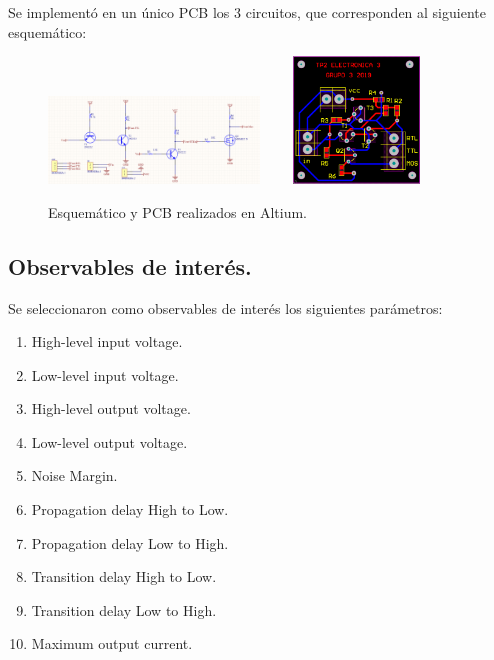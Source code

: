 Se implementó en un único PCB los 3 circuitos, que corresponden al siguiente esquemático:
\begin{figure}[H]	
	\centering
	\includegraphics[width=0.5\textwidth]{ImagenesEjercicio1/Esquematico.PNG} \ \ \ \
	\includegraphics[width=0.3\textwidth]{ImagenesEjercicio1/PCB.PNG}
	\caption{Esquemático y PCB realizados en Altium.}
	\label{fig:esquematico}
\end{figure}

\subsection{Observables de interés.}
\label{sec:Obs}

Se seleccionaron como observables de interés los siguientes parámetros:
\begin{enumerate}
\item \label{VIH} High-level input voltage. 
\item \label{VIL} Low-level input voltage.
\item \label{VOH} High-level output voltage.
\item \label{VOL} Low-level output voltage.
\item \label{NM} Noise Margin.
\item \label{PHL} Propagation delay High to Low.
\item \label{PLH} Propagation delay Low to High.
\item \label{THL} Transition delay High to Low.
\item \label{TLH} Transition delay Low to High.
\item \label{MOC} Maximum output current.
\end{enumerate}

